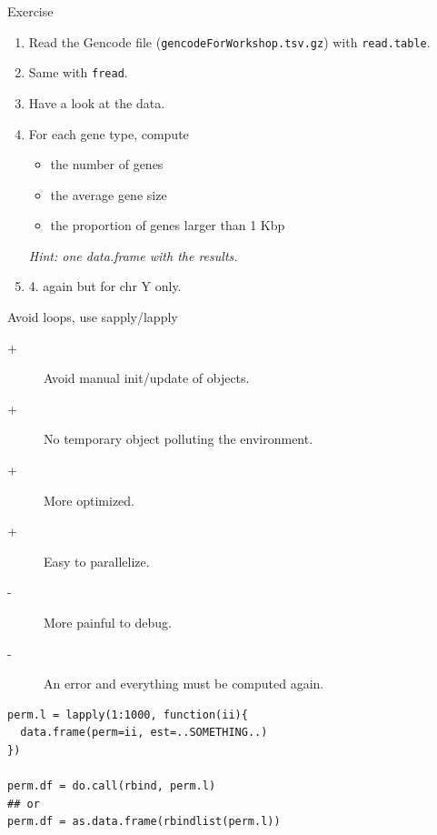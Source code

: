 \documentclass[10pt]{beamer}
\newcommand{\df}{{\it data.frame} }
\begin{document}
\begin{frame}[fragile]{Exercise}
  \begin{enumerate}
  \item Read the Gencode file (\verb!gencodeForWorkshop.tsv.gz!) with \verb!read.table!.
  \item Same with \verb!fread!.
  \item Have a look at the data.
  \item For each gene type, compute
    \begin{itemize}
    \item the number of genes
    \item the average gene size
    \item the proportion of genes larger than 1 Kbp
    \end{itemize}
    {\it Hint: one \df with the results.}
  \item 4. again but for chr Y only.
  \end{enumerate}
\end{frame}

\begin{frame}[fragile]{Avoid loops, use {\sf sapply/lapply}}
  \begin{block}{}
    \begin{description}
    \item[+] Avoid manual init/update of objects.
    \item[+] No temporary object polluting the environment.
    \item[+] More optimized.
    \item[+] Easy to parallelize.
    \item[-] More painful to debug.
    \item[-] An error and everything must be computed again.
    \end{description}
  \end{block}
  \begin{block}{}
  \begin{lstlisting}
perm.l = lapply(1:1000, function(ii){
  data.frame(perm=ii, est=..SOMETHING..)
})

perm.df = do.call(rbind, perm.l)
## or
perm.df = as.data.frame(rbindlist(perm.l))
  \end{lstlisting}
  \end{block}
\end{frame}
\end{document}
